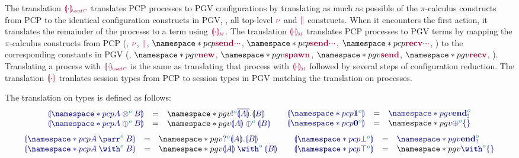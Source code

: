 The translation $\tm{\cpgvC{\cdot}}$ translates PCP processes to PGV configurations by translating as much as possible of the $\pi$-calculus constructs from PCP to the identical configuration constructs in PGV, \ie, all top-level $\tm{\nu}$ and $\tm{\parallel}$ constructs. When it encounters the first action, it translates the remainder of the processs to a term using $\tm{\cpgvM{\cdot}}$.
The translation $\tm{\cpgvM{\cdot}}$ translates PCP processes to PGV terms by mapping the $\pi$-calculus constructs from PCP (\eg, $\tm{\nu}$, $\tm{\parallel}$, $\pcp{\tm{\send{\cdot}{\cdot}{\cdot}}}$, $\pcp{\tm{\send{\cdot}{\cdot}{\cdot}}}$, $\pcp{\tm{\recv{\cdot}{\cdot}{\cdot}}}$, \etc) to the corresponding constants in PGV (\eg, $\pgv{\tm{\new}}$, $\pgv{\tm{\spawn}}$, $\pgv{\tm{\send}}$, $\pgv{\tm{\recv}}$, \etc).
Translating a process with $\tm{\cpgvC{\cdot}}$ is the same as translating that process with $\tm{\cpgvM{\cdot}}$ followed by several steps of configuration reduction.
The translation $\tm{\cpgvT{\cdot}}$ tranlates session types from PCP to session types in PGV matching the translation on processes.

The translation on types is defined as follows:
\[
  \begin{array}{lcl}
    \ty{\cpgvT{\pcp{\tytens[\cs{o}]{A}{B}}}}
    & = & \pgv{\ty{\tysend[\cs{o}]{\co{\cpgvT{A}}}{\cpgvT{B}}}}
    \\
    \ty{\cpgvT{\pcp{\typlus[\cs{o}]{A}{B}}}}
    & = & \pgv{\ty{\tyselect[\cs{o}]{\cpgvT{A}}{\cpgvT{B}}}}
  \end{array}
  \hfill\quad\hfill%
  \begin{array}{lcl}
    \ty{\cpgvT{\pcp{\tyone[\cs{o}]}}}
    & = & \ty{\pgv{\tyends[\cs{o}]}}
    \\
    \ty{\cpgvT{\pcp{\tynil[\cs{o}]}}}
    & = & \pgv{\ty{\tyselectemp[\cs{o}]}}
  \end{array}
\]%
\[%
  \begin{array}{lcl}
    \ty{\cpgvT{\pcp{\typarr[\cs{o}]{A}{B}}}}
    & = & \pgv{\ty{\tyrecv[\cs{o}]{\cpgvT{A}}{\cpgvT{B}}}}
    \\
    \ty{\cpgvT{\pcp{\tywith[\cs{o}]{A}{B}}}}
    & = & \pgv{\ty{\tyoffer[\cs{o}]{\cpgvT{A}}{\cpgvT{B}}}}
  \end{array}
  \hfill\quad\hfill%
  \begin{array}{lcl}
    \ty{\cpgvT{\pcp{\tybot[\cs{o}]}}}
    & = & \ty{\pgv{\tyendr[\cs{o}]}}
    \\
    \ty{\cpgvT{\pcp{\tytop[\cs{o}]}}}
    & = & \pgv{\ty{\tyofferemp[\cs{o}]}}
  \end{array}
\]

